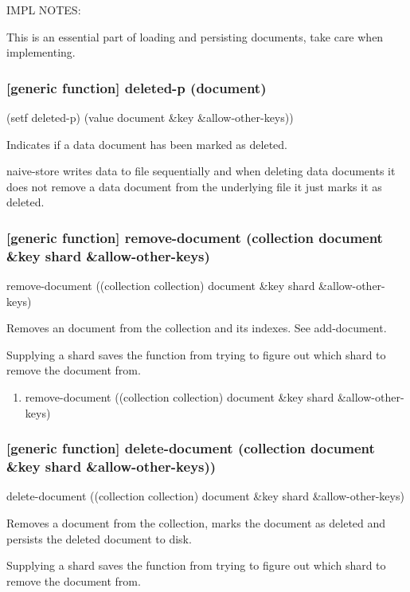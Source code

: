 \documentclass[11pt]{article}
\begin{document}
IMPL NOTES:

This is an essential part of loading and persisting documents, take
care when implementing.

\subsubsection{[generic function] deleted-p (document)}
\label{sec:orgf3bdc1c}

(setf deleted-p) (value document \&key \&allow-other-keys))

Indicates if a data document has been marked as deleted.

naive-store writes data to file sequentially and when deleting data
documents it does not remove a data document from the underlying file
it just marks it as deleted.

\subsubsection{[generic function] remove-document (collection document \&key shard \&allow-other-keys)}
\label{sec:org97bd3e7}

remove-document ((collection collection) document \&key shard \&allow-other-keys)

Removes an document from the collection and its indexes. See add-document.

Supplying a shard saves the function from trying to figure out which
shard to remove the document from.

\begin{enumerate}
\item remove-document ((collection collection) document \&key shard \&allow-other-keys)
\label{sec:org270413e}
\end{enumerate}

\subsubsection{[generic function] delete-document (collection document \&key shard \&allow-other-keys))}
\label{sec:org7189125}

delete-document ((collection collection) document \&key shard \&allow-other-keys)

Removes a document from the collection, marks the document as deleted
and persists the deleted document to disk.

Supplying a shard saves the function from trying to figure out which
shard to remove the document from.
\end{document}
